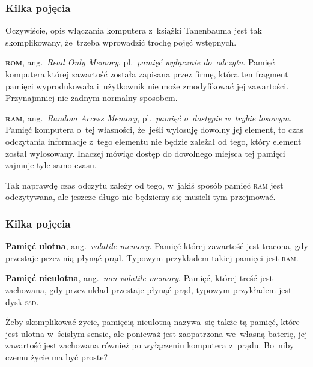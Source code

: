 \documentclass[10pt,t]{beamer}
\begin{document}
\begin{frame}
  \frametitle{Kilka pojęcia}


  Oczywiście, opis włączania komputera z~książki Tanenbauma jest tak
  skomplikowany, że~trzeba wprowadzić trochę pojęć wstępnych.

  \textbf{\textsc{rom}}, ang.~\textit{Read Only Memory}, pl.~\textit{pamięć
    wyłącznie do~odczytu}. Pamięć komputera której zawartość została
  zapisana przez firmę, która ten fragment pamięci wyprodukowała
  i~użytkownik nie może zmodyfikować jej zawartości. Przynajmniej nie żadnym
  normalny sposobem.

  \textbf{\textsc{ram}}, ang.~\textit{Random Access Memory},
  pl.~\textit{pamięć o~dostępie w~trybie losowym}. Pamięć komputera o~tej
  własności, że~jeśli wylosuję dowolny jej element, to czas odczytania
  informacje z~tego elementu nie będzie zależał od tego, który element
  został wylosowany. Inaczej mówiąc dostęp do dowolnego miejsca tej pamięci
  zajmuje tyle samo czasu.

  Tak naprawdę czas odczytu zależy od tego, w~jakiś sposób pamięć
  \textsc{ram} jest odczytywana, ale jeszcze długo nie będziemy się musieli
  tym przejmować.

\end{frame}





\begin{frame}
  \frametitle{Kilka pojęcia}


  \textbf{Pamięć ulotna}, ang.~\textit{volatile memory}. Pamięć której
  zawartość jest tracona, gdy przestaje przez nią płynąć prąd. Typowym
  przykładem takiej pamięci jest \textsc{ram}.

  \textbf{Pamięć nieulotna}, ang.~\textit{non-volatile memory}. Pamięć,
  której treść jest zachowana, gdy przez układ przestaje płynąć prąd,
  typowym przykładem jest dysk \textsc{ssd}.

  Żeby skomplikować życie, pamięcią nieulotną nazywa~się także tą pamięć,
  które jest ulotna w~ścisłym sensie, ale ponieważ jest zaopatrzona
  we~własną baterię, jej zawartość jest zachowana również po wyłączeniu
  komputera z~prądu. Bo~niby czemu życie ma być proste?

\end{frame}
\end{document}
